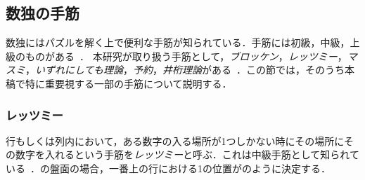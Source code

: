 \documentclass[submit,techrep,noauthor]{ipsj}
\begin{document}
\subsection{数独の手筋}

数独にはパズルを解く上で便利な手筋が知られている．手筋には初級，中級，上級のものがある~\cite{数独通信40}．
本研究が取り扱う手筋として，\emph{ブロッケン}，\emph{レッツミー}，\emph{マスミ}，\emph{いずれにしても理論}，\emph{予約}，\emph{井桁理論}がある~\cite{数独通信43}．この節では，そのうち本稿で特に重要視する一部の手筋について説明する．

	\subsubsection{レッツミー}
行もしくは列内において，ある数字の入る場所が1つしかない時にその場所にその数字を入れるという手筋を\emph{レッツミー}と呼ぶ．これは中級手筋として知られている~\cite{数独通信43}．の盤面の場合，一番上の行における1の位置がのように決定する．
\end{document}
